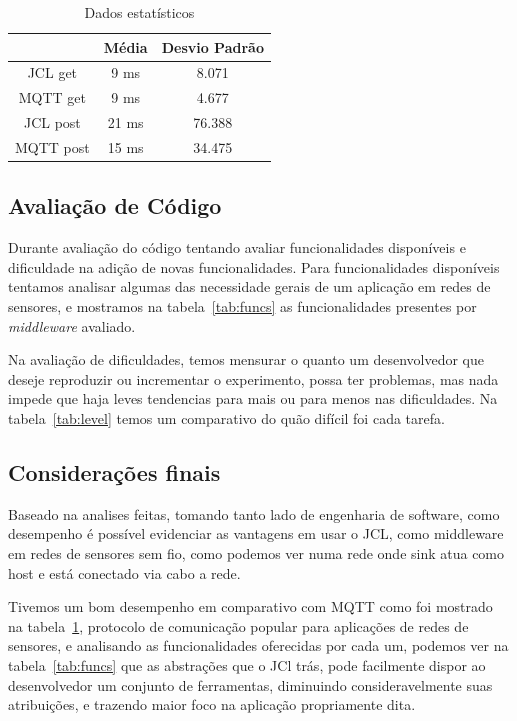 \documentclass[12pt]{article}
\begin{document}
\begin{table}[]
		
	\caption{Dados estatísticos}
	\centering
	\begin{tabular}{@{}ccc@{}}
		\toprule
		          & Média & Desvio Padrão \\ \midrule
		JCL get   & 9 ms   & 8.071          \\
		MQTT get  & 9 ms   & 4.677          \\
		JCL post  & 21 ms  & 76.388         \\
		MQTT post & 15 ms  & 34.475         \\ \bottomrule
	\end{tabular}
	\label{tab:statics}
\end{table}


\subsection{Avaliação de Código}\label{sec:code}

Durante avaliação do código tentando avaliar funcionalidades disponíveis e dificuldade na adição de novas funcionalidades. Para funcionalidades disponíveis tentamos analisar algumas das necessidade gerais de um aplicação em redes de sensores, e mostramos na tabela~\ref{tab:funcs} as funcionalidades presentes por \textit{middleware} avaliado.

Na avaliação de dificuldades, temos mensurar o quanto um desenvolvedor que deseje reproduzir ou incrementar o experimento, possa ter problemas, mas nada impede que haja leves tendencias para mais ou para menos nas dificuldades. Na tabela~\ref{tab:level} temos um comparativo do quão difícil foi cada tarefa.

\subsection{Considerações finais}
Baseado na analises feitas, tomando tanto lado de engenharia de software, como desempenho é possível evidenciar as vantagens em usar o JCL, como middleware em redes de sensores sem fio, como podemos ver numa rede onde sink atua como host e está conectado via cabo a rede.

Tivemos um bom desempenho em comparativo com MQTT como foi mostrado na tabela~\ref{tab:statics}, protocolo de comunicação popular para aplicações de redes de sensores, e analisando as funcionalidades oferecidas por cada um, podemos ver na tabela~\ref{tab:funcs} que as abstrações que o JCl trás, pode facilmente dispor ao desenvolvedor um conjunto de ferramentas, diminuindo consideravelmente suas atribuições, e trazendo maior foco na aplicação propriamente dita.
\end{document}
